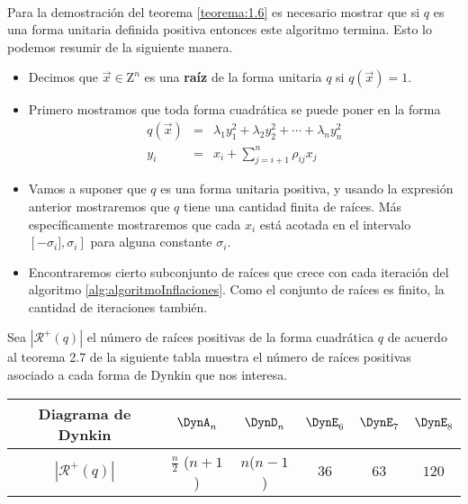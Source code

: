 \paragraph{}
Para la demostración del teorema \ref{teorema:1.6} es necesario mostrar que si $q$ es una forma unitaria definida positiva entonces este algoritmo termina. Esto lo podemos resumir de la siguiente manera.\\
\begin{itemize}
	\item Decimos que $\overrightarrow{x} \in \mathrm{Z}^{n}$ es una \textbf{raíz} de la forma unitaria $q$ si $q(\overrightarrow{x}) = 1$.
	\item Primero mostramos que toda forma cuadrática se puede poner en la forma
	\begin{eqnarray*}
		q({\overrightarrow{x}}) &  =  & \lambda_{1}y_{1}^{2} + \lambda_{2}y_{2}^{2} + \cdots + \lambda_{n}y_{n}^{2} \\
		y_{i} &  =  & x_{i}+ \sum_{j=i+1}^{n}\rho_{ij}x_{j}
	\end{eqnarray*}
	\item Vamos a suponer que $q$ es una forma unitaria positiva, y usando la expresión anterior mostraremos que $q$ tiene una cantidad finita de raíces. Más específicamente mostraremos que cada $x_{i}$ está acotada en el intervalo $\left[-\sigma_{i}], \sigma_{i}\right]$ para alguna constante $\sigma_{i}$.
	\item Encontraremos cierto subconjunto de raíces que crece con cada iteración del algoritmo \ref{alg:algoritmoInflaciones}. Como el conjunto de raíces es finito, la cantidad de iteraciones también.
\end{itemize}
Sea $|\mathcal{R}^{+}(q)|$ el número de raíces positivas de la forma cuadrática $q$ de acuerdo al teorema 2.7 de  \citep{10.3233/FI-2018-1653} la siguiente tabla muestra el número de raíces positivas asociado a cada forma de Dynkin que nos interesa.
\begin{tabular}{|c|c|c|c|c|c|}
	Diagrama de Dynkin & $\DynA_{n}$ & $\DynD_{n}$ & $\DynE_{6}$ & $\DynE_{7}$ & $\DynE_{8}$ \\ \hline
	$|\mathcal{R}^{+}(q)|$ & $\frac{n}{2}$ ($n + 1$) & $n$($n-1$) & $36$ & $63$ & $120$ \\ 
\end{tabular}
